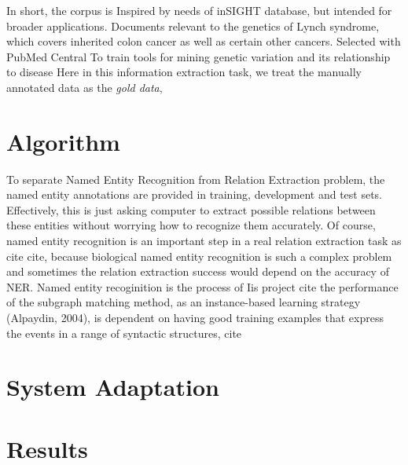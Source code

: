 In short, the corpus is Inspired by needs of inSIGHT database, but intended for broader applications. Documents relevant to the genetics of Lynch syndrome, which covers inherited colon cancer as well as certain other cancers. Selected with PubMed Central To train tools for mining genetic variation and its relationship to disease
Here in this information extraction task, we treat the manually annotated data as the \emph{gold data}, 
\section{Algorithm}
To separate Named Entity Recognition from Relation Extraction problem, the named entity annotations are provided in training, development and test sets. Effectively, this is just asking computer to extract possible relations between these entities without worrying how to recognize them accurately. Of course, named entity recognition is an important step in a real relation extraction task as cite cite, because biological named entity recognition is such a complex problem and sometimes the relation extraction success would depend on the accuracy of NER.
Named entity recoginition is the process of 
Iis project 
cite
the performance of the subgraph matching method, as an instance-based learning strategy (Alpaydin, 2004), is dependent on having good training examples that express the events in a range of syntactic structures, cite

\section{System Adaptation}


\section{Results}

